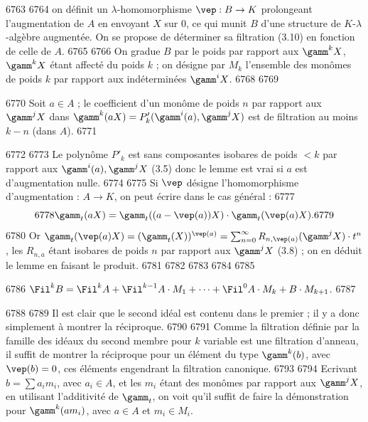   6763	%
  6764	on d\'efinit un $\lambda$-homomorphisme $\vep : B \to K$ prolongeant l'augmentation de $A$ en envoyant $X$ sur 0, ce qui munit $B$ d'une structure de $K$-$\lambda$-alg\`ebre augment\'ee. On se propose de d\'eterminer sa filtration (3.10) en fonction de celle de $A$.
  6765	
  6766		On gradue $B$ par le poids par rapport aux $\gamm^k X$, $\gamm^k X$ \'etant affect\'e du poids $k$ ; on d\'esigne par $M_k$ l'ensemble des mon\^omes de poids $k$ par rapport aux ind\'etermin\'ees $\gamm^i X$.
  6768	
  6769	\begin{lemme}
  6770	Soit $a \in A$ ; le coefficient d'un mon\^ome de poids $n$ par rapport aux $\gamm^j X$ dans $\gamm^k(aX) = P'_k(\gamm^i(a), \gamm^j X)$ est de filtration au moins $k-n$ (dans $A$).
  6771	\end{lemme}
  6772	
  6773	Le polyn\^ome $P'_k$ est sans composantes isobares de poids $< k$ par rapport aux $\gamm^i(a), \gamm^j X$ (3.5) donc le lemme est vrai si $a$ est d'augmentation nulle.
  6774	
  6775		Si $\vep$ d\'esigne l'homomorphisme d'augmentation : $A \to K$, on peut \'ecrire dans le cas g\'en\'eral :
  6777	\[
  6778	\gamm_t(aX) = \gamm_t((a - \vep(a))X) \cdot \gamm_t(\vep(a)X).
  6779	\]
  6780	Or $\gamm_t(\vep(a)X) = (\gamm_t(X))^{\vep(a)} = \sum_{n=0}^{\infty} R_{n,\vep(a)}(\gamm^j X) \cdot t^n$, les $R_{n,a}$ \'etant isobares de poids $n$ par rapport aux $\gamm^j X$ (3.8) ; on en d\'eduit le lemme en faisant le produit.
  6781	
  6782	%
  6783	%
  6784	%
  6785	\begin{proposition}
  6786	$\Fil^k B = \Fil^k A + \Fil^{k-1} A \cdot M_1 + \cdots + \Fil^0 A \cdot M_k + B \cdot M_{k+1}$.
  6787	\end{proposition}
  6788	
  6789	Il est clair que le second id\'eal est contenu dans le premier ; il y a donc simplement \`a montrer la r\'eciproque.
  6790	
  6791		Comme la filtration d\'efinie par la famille des id\'eaux du second membre pour $k$ variable est une filtration d'anneau, il suffit de montrer la r\'eciproque pour un \'el\'ement du type $\gamm^k(b)$, avec $\vep(b) = 0$, ces \'el\'ements engendrant la filtration canonique.
  6793	
  6794		Ecrivant $b = \sum a_i m_i$, avec $a_i \in A$, et les $m_i$ \'etant des mon\^omes par rapport aux $\gamm^j X$, en utilisant l'additivit\'e de $\gamm_t$, on voit qu'il suffit de faire la d\'emonstration pour $\gamm^k(a m_i)$, avec $a \in A$ et $m_i \in M_i$.
